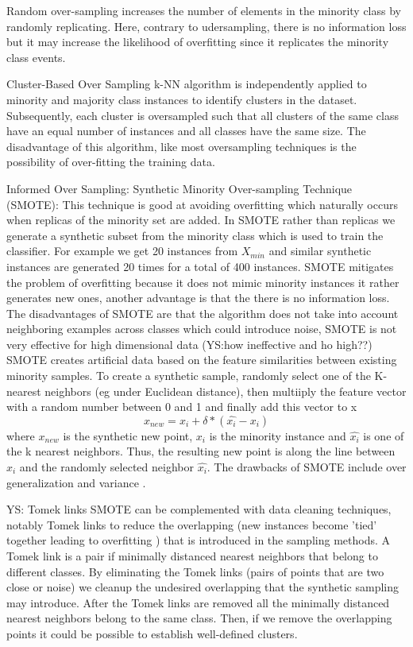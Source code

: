 \documentclass[11pt]{article}
\begin{document}
Random over-sampling increases the number of elements in the minority class by randomly replicating. Here, contrary to udersampling, there is no information loss but it may increase the likelihood of overfitting since it replicates the minority class events.

Cluster-Based Over Sampling k-NN algorithm is independently applied to minority and majority class instances to identify clusters in the dataset. Subsequently, each cluster is oversampled such that all clusters of the same class have an equal number of instances and all classes have the same size. The disadvantage of this algorithm, like most oversampling techniques is the possibility of over-fitting the training data.  

Informed Over Sampling: Synthetic Minority Over-sampling Technique (SMOTE): This technique is good at avoiding overfitting which naturally occurs when replicas of the minority set are added. In SMOTE rather than replicas we generate a synthetic subset from the minority class which is used to train the classifier. For example we get 20 instances from $X_{min}$ and similar synthetic instances are generated 20 times for a total of 400 instances. SMOTE mitigates the problem of overfitting because it does not mimic minority instances it rather generates new ones, another advantage is that the there is no information loss.
The disadvantages of SMOTE are that the algorithm does not take into account neighboring examples across classes which could introduce noise, SMOTE is not very effective for high dimensional data (YS:how ineffective and ho high??)
SMOTE creates artificial data based on the feature similarities between existing minority samples. To create a synthetic sample, randomly select one of the K-nearest neighbors (eg under Euclidean distance), then multiiply the feature vector with a random number between 0 and 1 and finally add this vector to x
\begin{equation}
x_{new} =  x_i + \delta * (\hat{x_i} - x_i)
\end{equation}
where $x_{new}$ is the synthetic new point, $x_i$ is the minority instance and $\hat{x_i}$ is one of the k nearest neighbors. Thus, the resulting new point is along the line between $x_i$ and the randomly selected neighbor $\hat{x_i}$. The drawbacks of SMOTE include over generalization and variance \cite{wang2004imbalanced}.

YS: Tomek links
SMOTE can be complemented with data cleaning techniques, notably Tomek links \cite{tomek1976two} to reduce the overlapping (new instances become 'tied' together leading to overfitting \cite{mease2007boosted}) that is introduced in the sampling methods.
A Tomek link is a pair if minimally distanced nearest neighbors that belong to different classes. By eliminating the Tomek links (pairs of points that are two close or noise) we cleanup the undesired overlapping that the synthetic sampling may introduce. After the Tomek links are removed all the minimally distanced nearest neighbors belong to the same class. Then, if we remove the overlapping points it could be possible to establish well-defined clusters. 
\end{document}
